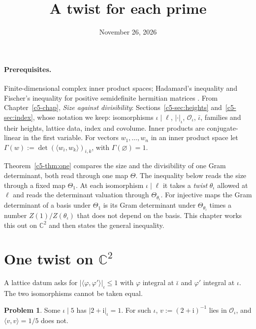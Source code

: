 \documentclass[reqno]{amsart}
\title{A twist for each prime}
\author{}
\date{November 26, 2026}
\newcounter{chap}
\theoremstyle{definition}
\newtheorem{problem}{Problem}[section]
\theoremstyle{plain}
\theoremstyle{remark}
\newcommand{\C}{\mathbb{C}}
\newcommand{\Oc}{\mathcal{O}}
\newcommand{\ii}{\mathrm{i}}
\begin{document}
\maketitle
{}\label{chap}

\paragraph{Prerequisites.}
Finite-dimensional complex inner product spaces; Hadamard's inequality and Fischer's inequality for positive semidefinite hermitian matrices \cite[\S7.8]{HJ}.  From Chapter~\ref{c5-chap}, \emph{Size against divisibility}: Sections~\ref{c5-sec:heights} and~\ref{c5-sec:index}, whose notation we keep: isomorphisms \(\iota \mid \ell\), \(\lvert\cdot\rvert_\iota\), \(\Oc_\iota\), \(\bar\iota\), families and their heights, lattice data, index and covolume.  Inner products are conjugate-linear in the first variable.  For vectors \(w_1, \dots, w_n\) in an inner product space let \(\Gamma(w) := \det(\langle w_i, w_k \rangle)_{i,k}\), with \(\Gamma(\varnothing) = 1\).

\medskip
Theorem~\ref{c5-thm:one} compares the size and the divisibility of one Gram determinant, both read through one map \(\Theta\).  The inequality below reads the size through a fixed map \(\Theta_1\).  At each isomorphism \(\iota \mid \ell\) it takes a \emph{twist} \(\theta_\iota\) allowed at \(\ell\) and reads the determinant valuation through \(\Theta_{\theta_\iota}\).  For injective maps the Gram determinant of a basis under \(\Theta_1\) is its Gram determinant under \(\Theta_{\theta_\iota}\) times a number \(Z(1)/Z(\theta_\iota)\) that does not depend on the basis.  This chapter works this out on \(\C^2\) and then states the general inequality.

\section{One twist on \texorpdfstring{\(\C^2\)}{C2}}\label{sec:toy}

A lattice datum asks for \(\lvert \langle \varphi, \varphi' \rangle \rvert_\iota \le 1\) with \(\varphi\) integral at \(\bar\iota\) and \(\varphi'\) integral at \(\iota\).  The two isomorphisms cannot be taken equal.

\begin{problem}\label{pr:one-place}
Some \(\iota \mid 5\) has \(\lvert 2 + \ii \rvert_\iota = 1\).  For such \(\iota\), \(v := (2 + \ii)^{-1}\) lies in \(\Oc_\iota\), and \(\langle v, v \rangle = 1/5\) does not.
\end{problem}
\end{document}
